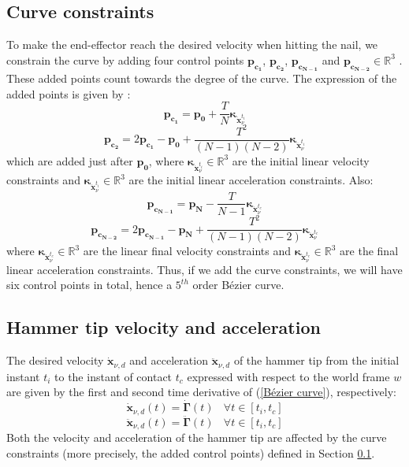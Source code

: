 \documentclass[conference]{IEEEtran}
\begin{document}
\subsection{Curve constraints}
\label{Curve constraints}
\noindent
To make the end-effector reach the desired velocity when hitting the nail, we constrain the curve by adding four control points $\mathbf{p_{c_1}}$, $\mathbf{p_{c_2}}$, $\mathbf{p_{c_{N-1}}}$ and $\mathbf{p_{c_{N-2}}} \in \mathbb{R}^3$ . These added points count towards the degree of the curve. The expression of the added points is given by \cite{NDCURVESLIB}:
\begin{equation}
    \mathbf{p_{c_1}} = \mathbf{p_0} + \frac{T}{N} \bm {\kappa}_{\mathbf{\dot x}_{\nu}^{t_i}}
\end{equation}
\begin{equation}
    \mathbf{p_{c_2}} = 2\mathbf{p_{c_1}} - \mathbf{p_0} + \frac{T^2}{\left(N-1 \right) \left(N-2 \right)} \bm {\kappa}_{\mathbf{\ddot x}_{\nu}^{t_i}}
\end{equation}
which are added just after $\mathbf{p_0}$, where $\bm {\kappa}_{\mathbf{\dot x}_{\nu}^{t_i}} \in \mathbb{R}^3$ are the initial linear velocity constraints and $\bm {\kappa}_{\mathbf{\ddot x}_{\nu}^{t_i}} \in \mathbb{R}^3$ are the initial linear acceleration constraints.
Also:
\begin{equation}
    \mathbf{p_{c_{N-1}}} = \mathbf{p_N} - \frac{T}{N -1} \bm {\kappa}_{\mathbf{\dot x}_{\nu}^{t_c}}
\end{equation}
\begin{equation}
    \mathbf{p_{c_{N-2}}} = 2\mathbf{p_{c_{N-1}}} - \mathbf{p_N} + \frac{T^2}{\left(N-1 \right) \left(N-2 \right)} \bm {\kappa}_{\mathbf{\ddot x}_{\nu}^{t_c}}
\end{equation}
where $\bm {\kappa}_{\mathbf{\dot x}_{\nu}^{t_c}} \in \mathbb{R}^3$ are the linear final velocity constraints and $\bm {\kappa}_{\mathbf{\ddot x}_{\nu}^{t_c}} \in \mathbb{R}^3$ are the final linear acceleration constraints.
Thus, if we add the curve constraints, we will have six control points in total, hence a $5^{th}$ order Bézier curve.

\subsection{Hammer tip velocity and acceleration}
\label{Hammer tip velocity and acceleration}
\noindent
The desired velocity $\mathbf{\dot x}_{\nu, d}$ and acceleration $\mathbf{\ddot x}_{\nu, d}$ of the hammer tip from the initial instant $t_i$ to the instant of contact $t_c$ expressed with respect to the world frame $w$ are given by the first and second time derivative of (\ref{Bézier curve}), respectively:
\begin{equation}
    \mathbf{\dot x}_{\nu, d}(t) = \bm {\dot \Gamma}(t) \ \ \ \ \forall t \in [t_i, t_c]
\end{equation}
\begin{equation}
    \mathbf{\ddot x}_{\nu, d}(t) = \bm {\ddot \Gamma}(t) \ \ \ \ \forall t \in [t_i, t_c]
\end{equation}
Both the velocity and acceleration of the hammer tip are affected by the curve constraints (more precisely, the added control points) defined in Section \ref{Curve constraints}. 
\end{document}
